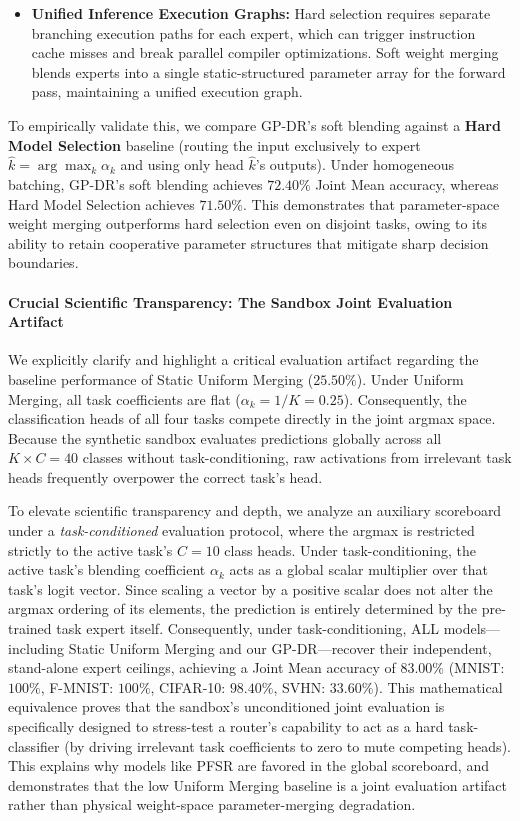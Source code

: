 \begin{enumerate}
\begin{itemize}
        \item \textbf{Unified Inference Execution Graphs:} Hard selection requires separate branching execution paths for each expert, which can trigger instruction cache misses and break parallel compiler optimizations. Soft weight merging blends experts into a single static-structured parameter array for the forward pass, maintaining a unified execution graph.
    \end{itemize}
    To empirically validate this, we compare GP-DR's soft blending against a \textbf{Hard Model Selection} baseline (routing the input exclusively to expert $\hat{k} = \arg\max_k \alpha_k$ and using only head $\hat{k}$'s outputs). Under homogeneous batching, GP-DR's soft blending achieves \textbf{$72.40\%$} Joint Mean accuracy, whereas Hard Model Selection achieves \textbf{$71.50\%$}. This demonstrates that parameter-space weight merging outperforms hard selection even on disjoint tasks, owing to its ability to retain cooperative parameter structures that mitigate sharp decision boundaries.
\end{enumerate}

\paragraph{Crucial Scientific Transparency: The Sandbox Joint Evaluation Artifact}
We explicitly clarify and highlight a critical evaluation artifact regarding the baseline performance of Static Uniform Merging ($25.50\%$). Under Uniform Merging, all task coefficients are flat ($\alpha_k = 1/K = 0.25$). Consequently, the classification heads of all four tasks compete directly in the joint argmax space. Because the synthetic sandbox evaluates predictions globally across all $K \times C = 40$ classes without task-conditioning, raw activations from irrelevant task heads frequently overpower the correct task's head.

To elevate scientific transparency and depth, we analyze an auxiliary scoreboard under a \emph{task-conditioned} evaluation protocol, where the argmax is restricted strictly to the active task's $C=10$ class heads. Under task-conditioning, the active task's blending coefficient $\alpha_k$ acts as a global scalar multiplier over that task's logit vector. Since scaling a vector by a positive scalar does not alter the argmax ordering of its elements, the prediction is entirely determined by the pre-trained task expert itself. Consequently, under task-conditioning, ALL models---including Static Uniform Merging and our GP-DR---recover their independent, stand-alone expert ceilings, achieving a Joint Mean accuracy of \textbf{$83.00\%$} (MNIST: $100\%$, F-MNIST: $100\%$, CIFAR-10: $98.40\%$, SVHN: $33.60\%$). This mathematical equivalence proves that the sandbox's unconditioned joint evaluation is specifically designed to stress-test a router's capability to act as a hard task-classifier (by driving irrelevant task coefficients to zero to mute competing heads). This explains why models like PFSR are favored in the global scoreboard, and demonstrates that the low Uniform Merging baseline is a joint evaluation artifact rather than physical weight-space parameter-merging degradation.

